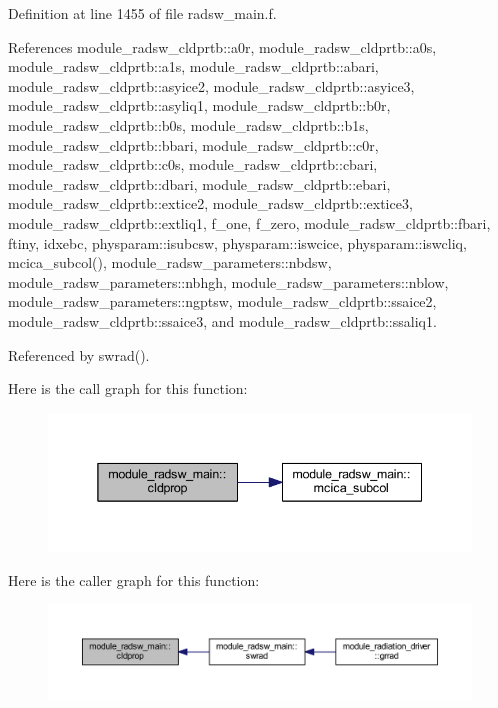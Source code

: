Definition at line 1455 of file radsw\+\_\+main.\+f.



References module\+\_\+radsw\+\_\+cldprtb\+::a0r, module\+\_\+radsw\+\_\+cldprtb\+::a0s, module\+\_\+radsw\+\_\+cldprtb\+::a1s, module\+\_\+radsw\+\_\+cldprtb\+::abari, module\+\_\+radsw\+\_\+cldprtb\+::asyice2, module\+\_\+radsw\+\_\+cldprtb\+::asyice3, module\+\_\+radsw\+\_\+cldprtb\+::asyliq1, module\+\_\+radsw\+\_\+cldprtb\+::b0r, module\+\_\+radsw\+\_\+cldprtb\+::b0s, module\+\_\+radsw\+\_\+cldprtb\+::b1s, module\+\_\+radsw\+\_\+cldprtb\+::bbari, module\+\_\+radsw\+\_\+cldprtb\+::c0r, module\+\_\+radsw\+\_\+cldprtb\+::c0s, module\+\_\+radsw\+\_\+cldprtb\+::cbari, module\+\_\+radsw\+\_\+cldprtb\+::dbari, module\+\_\+radsw\+\_\+cldprtb\+::ebari, module\+\_\+radsw\+\_\+cldprtb\+::extice2, module\+\_\+radsw\+\_\+cldprtb\+::extice3, module\+\_\+radsw\+\_\+cldprtb\+::extliq1, f\+\_\+one, f\+\_\+zero, module\+\_\+radsw\+\_\+cldprtb\+::fbari, ftiny, idxebc, physparam\+::isubcsw, physparam\+::iswcice, physparam\+::iswcliq, mcica\+\_\+subcol(), module\+\_\+radsw\+\_\+parameters\+::nbdsw, module\+\_\+radsw\+\_\+parameters\+::nbhgh, module\+\_\+radsw\+\_\+parameters\+::nblow, module\+\_\+radsw\+\_\+parameters\+::ngptsw, module\+\_\+radsw\+\_\+cldprtb\+::ssaice2, module\+\_\+radsw\+\_\+cldprtb\+::ssaice3, and module\+\_\+radsw\+\_\+cldprtb\+::ssaliq1.



Referenced by swrad().



Here is the call graph for this function\+:\nopagebreak
\begin{figure}[H]
\begin{center}
\leavevmode
\includegraphics[width=338pt]{namespacemodule__radsw__main_ae9779a4f9bc2ddc9d856c844639c9bd3_cgraph}
\end{center}
\end{figure}




Here is the caller graph for this function\+:\nopagebreak
\begin{figure}[H]
\begin{center}
\leavevmode
\includegraphics[width=350pt]{namespacemodule__radsw__main_ae9779a4f9bc2ddc9d856c844639c9bd3_icgraph}
\end{center}
\end{figure}


